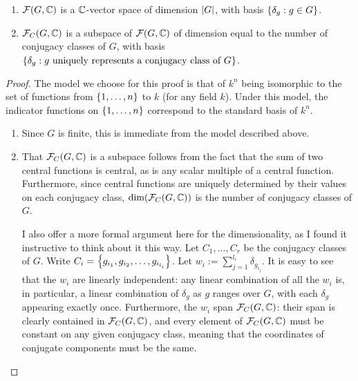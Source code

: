 \begin{proposition} \hfill
    \begin{enumerate}[label = \normalfont \arabic*., noitemsep]
        \item $\mathcal{F}\!\left( G, \mathbb{C} \right)$ is a $\mathbb{C}$-vector space of dimension $\left\lvert G \right\rvert$, with basis $\left\{ \delta_g : g \in G \right\}$.
        \item $\mathcal{F}_C\!\left( G, \mathbb{C} \right)$ is a subspace of $\mathcal{F}\!\left( G, \mathbb{C} \right)$ of dimension equal to the number of conjugacy classes of $G$, with basis $\left\{ \delta_g : g \text{ uniquely represents a conjugacy class of $G$} \right\}$.
    \end{enumerate}
\end{proposition}
\begin{proof}
    The model we choose for this proof is that of $k^n$ being isomorphic to the set of functions from $\left\{ 1, \ldots, n \right\}$ to $k$ (for any field $k$). Under this model, the indicator functions on $\left\{ 1, \ldots, n \right\}$ correspond to the standard basis of $k^n$. %
    \begin{enumerate}
        \item Since $G$ is finite, this is immediate from the model described above.
        \item That $\mathcal{F}_C\!\left( G, \mathbb{C} \right)$ is a subspace follows from the fact that the sum of two central functions is central, as is any scalar multiple of a central function. Furthermore, since central functions are uniquely determined by their values on each conjugacy class, $\dim\!\left( \mathcal{F}_C\!\left( G, \mathbb{C} \right) \right)$ is the number of conjugacy classes of $G$.
        
        I also offer a more formal argument here for the dimensionality, as I found it instructive to think about it this way. Let $C_1, \ldots, C_r$ be the conjugacy classes of $G$. Write $C_i = \left\{ g_{i_1}, g_{i_2}, \ldots, g_{i_{l_i}} \right\}$. Let $w_i := \sum_{j=1}^{l_i} \delta_{g_{i_j}}$. It is easy to see that the $w_i$ are linearly independent: any linear combination of all the $w_i$ is, in particular, a linear combination of $\delta_{g}$ as $g$ ranges over $G$, with each $\delta_g$ appearing exactly once. Furthermore, the $w_i$ span $\mathcal{F}_C\!\left( G, \mathbb{C} \right)$: their span is clearly contained in $\mathcal{F}_C\!\left( G, \mathbb{C} \right)$, and every element of $\mathcal{F}_C\!\left( G, \mathbb{C} \right)$ must be constant on any given conjugacy class, meaning that the coordinates of conjugate components must be the same.
    \end{enumerate}
\end{proof}

